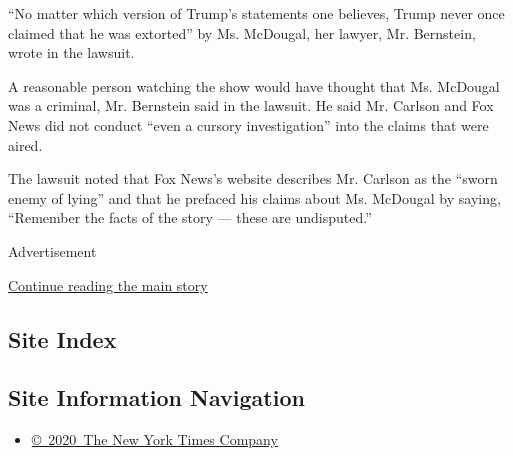 ``No matter which version of Trump's statements one believes, Trump
never once claimed that he was extorted'' by Ms. McDougal, her lawyer,
Mr. Bernstein, wrote in the lawsuit.

A reasonable person watching the show would have thought that Ms.
McDougal was a criminal, Mr. Bernstein said in the lawsuit. He said Mr.
Carlson and Fox News did not conduct ``even a cursory investigation''
into the claims that were aired.

The lawsuit noted that Fox News's website describes Mr. Carlson as the
``sworn enemy of lying'' and that he prefaced his claims about Ms.
McDougal by saying, ``Remember the facts of the story --- these are
undisputed.''

Advertisement

\protect\hyperlink{after-bottom}{Continue reading the main story}

\hypertarget{site-index}{%
\subsection{Site Index}\label{site-index}}

\hypertarget{site-information-navigation}{%
\subsection{Site Information
Navigation}\label{site-information-navigation}}

\begin{itemize}
\tightlist
\item
  \href{https://help.nytimes3xbfgragh.onion/hc/en-us/articles/115014792127-Copyright-notice}{©~2020~The
  New York Times Company}
\end{itemize}

